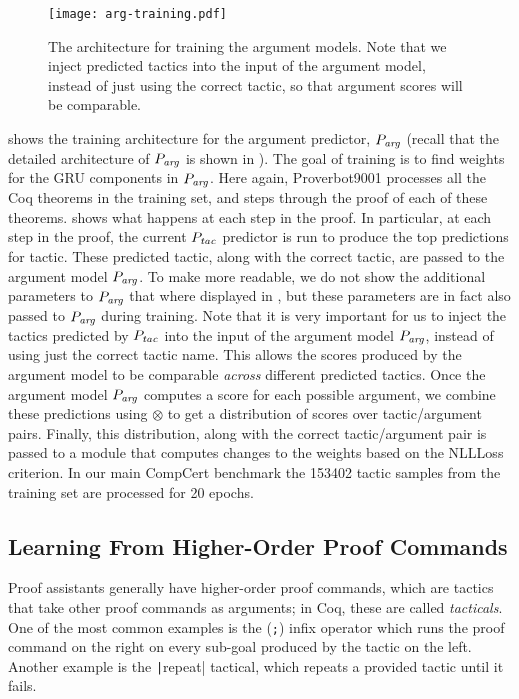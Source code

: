 \documentclass[sigplan,screen]{acmart}
\newcommand{\name}{Proverbot9001\xspace}
\newcommand{\coqinline}[1]{\texttt|#1|}
\newcommand{\PTac}{P_{\it tac}}
\newcommand{\PArg}{P_{\it arg}}
\newcommand{\Combine}{\otimes}
\renewcommand{\>}{\quad}
\begin{document}
\begin{figure}
\texttt{[image: arg-training.pdf]}
\caption{The architecture for training the argument
  models. Note that we inject predicted tactics into the input of
  the argument model, instead of just using the correct tactic,
  so that argument scores will be comparable.}
\label{fig:arg-training}
\end{figure}

 shows the training architecture for the argument predictor, $\PArg$ (recall that the detailed architecture of $\PArg$ is shown in ).
The goal of training is to find weights for the GRU components in $\PArg$.
Here again, \name{} processes all the Coq theorems in the training set, and steps through the proof of each of these theorems.  shows what happens at each step in the proof.
In particular, at each step in the proof, the current $\PTac$ predictor is run to produce the top predictions for tactic.
These predicted tactic, along with the correct tactic, are passed to the argument model $\PArg$.
To make  more readable, we do not show the additional parameters to $\PArg$ that where displayed in , but these parameters are in fact also passed to $\PArg$ during training.
Note that it is very important for us to inject the tactics predicted by $\PTac$ into the input of the argument model $\PArg$, instead of using just the correct tactic name.
This allows the scores produced by the argument model to be comparable \emph{across} different predicted tactics.
Once the argument model $\PArg$ computes a score for each possible argument, we combine these predictions using $\Combine$ to get a distribution of scores over tactic/argument pairs.
Finally, this distribution, along with the correct tactic/argument pair is passed to a module that computes changes to the weights based on the NLLLoss criterion.
In our main CompCert benchmark the 153402 tactic samples from the training set are processed for 20 epochs.




\subsection{Learning From Higher-Order Proof Commands}

Proof assistants generally have higher-order proof commands, which are tactics that take other proof commands as arguments;
in Coq, these are called \emph{tacticals}.
One of the most common examples is the (\verb-;-) infix operator which runs the proof command on the right on every sub-goal produced by the tactic on the left.
Another example is the \coqinline{repeat} tactical, which repeats a provided tactic until it fails.
\end{document}
